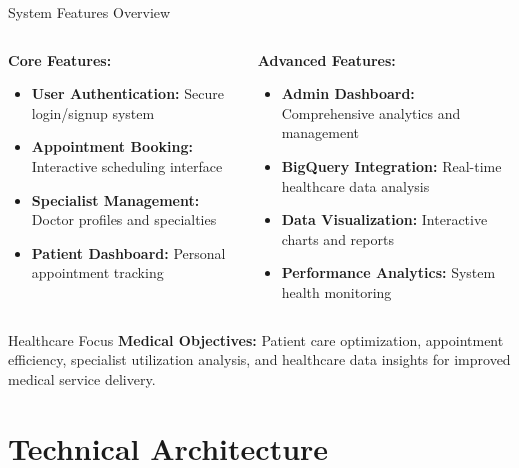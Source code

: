 \documentclass[aspectratio=169]{beamer}
\begin{document}
\begin{frame}{System Features Overview}
\begin{columns}
\begin{column}{0.5\textwidth}
\textbf{Core Features:}
\begin{itemize}
    \item \textbf{User Authentication:} Secure login/signup system
    \item \textbf{Appointment Booking:} Interactive scheduling interface
    \item \textbf{Specialist Management:} Doctor profiles and specialties
    \item \textbf{Patient Dashboard:} Personal appointment tracking
\end{itemize}
\end{column}
\begin{column}{0.5\textwidth}
\textbf{Advanced Features:}
\begin{itemize}
    \item \textbf{Admin Dashboard:} Comprehensive analytics and management
    \item \textbf{BigQuery Integration:} Real-time healthcare data analysis
    \item \textbf{Data Visualization:} Interactive charts and reports
    \item \textbf{Performance Analytics:} System health monitoring
\end{itemize}
\end{column}
\end{columns}

\vspace{1cm}

\begin{block}{Healthcare Focus}
\textbf{Medical Objectives:} Patient care optimization, appointment efficiency, specialist utilization analysis, and healthcare data insights for improved medical service delivery.
\end{block}
\end{frame}

\section{Technical Architecture}
\end{document}
